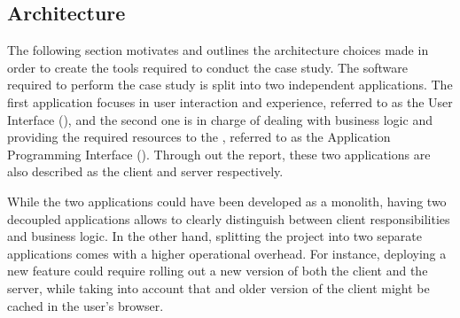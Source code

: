 \subsection{Architecture} \label{subsect:case-study:arch}
The following section motivates and outlines the architecture choices made in order to create the tools required to conduct the case study. The software required to perform the case study is split into two independent applications. The first application focuses in user interaction and experience, referred to as the \mlblink User Interface (\mlblinkui), and the second one is in charge of dealing with business logic and providing the required resources to the \mlblinkui, referred to as the \mlblink Application Programming Interface (\mlblinkapi). Through out the report, these two applications are also described as the client and server respectively.

While the two applications could have been developed as a monolith, having two decoupled applications allows to clearly distinguish between client responsibilities and business logic. In the other hand, splitting the project into two separate applications comes with a higher operational overhead. For instance, deploying a new feature could require rolling out a new version of both the client and the server, while taking into account that and older version of the client might be cached in the user's browser.